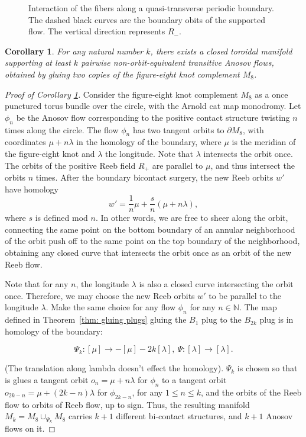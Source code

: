 \documentclass[10pt,a4paper]{amsart}
\newtheorem{corollary}{Corollary}
\begin{document}
\begin{figure}
    \centering
    
    \caption{Interaction of the fibers along a quasi-transverse periodic boundary. The dashed black curves are the boundary obits of the supported flow. The vertical direction represents $R_-$.  }
    \label{fig:Fibers}
\end{figure}

\begin{corollary}
\label{cor:figure8}
For any natural number $k$, there exists a closed toroidal manifold supporting at least $k$ pairwise non-orbit-equivalent transitive Anosov flows, obtained by gluing two copies of the figure-eight knot complement $M_8$.
\end{corollary}

\begin{proof}[Proof of Corollary \ref{cor:figure8}]
Consider the figure-eight knot complement $M_8$ as a once punctured torus bundle over the circle, with the Arnold cat map monodromy. Let $\phi_n$ be the Anosov flow corresponding to the positive contact structure twisting $n$ times along the circle.
The flow $\phi_n$ has two tangent orbits to $\partial M_8$, with coordinates $\mu+n\lambda$ in the homology of the boundary, where $\mu$ is the meridian of the figure-eight knot and $\lambda$ the longitude. 
Note that $\lambda$ intersects the orbit once.
The orbits of the positive Reeb field $R_+$ are parallel to $\mu$, and thus intersect the orbits $n$ times. After the boundary bicontact surgery, the new Reeb orbits $w'$ have homology 
\[
w'=\frac{1}{n}\mu+\frac{s}{n} (\mu+n\lambda),
\]
where $s$ is defined mod $n$. In other words, we are free to sheer along the orbit, connecting the same point on the bottom boundary of an annular neighborhood of the orbit push off to the same point on the top boundary of the neighborhood, obtaining any closed curve that intersects the orbit once as an orbit of the new Reeb flow.

Note that for any $n$, the longitude $\lambda$ is also a closed curve intersecting the orbit once. 
Therefore, we may choose the new Reeb orbits $w'$ to be parallel to the longitude $\lambda$. Make the same choice for any flow $\phi_n$ for any $n\in\mathbb{N}$. The map defined in Theorem~\ref{thm: gluing plugs} gluing the $B_1$ plug to the $B_{2k}$ plug is in homology of the boundary: 

\[
\Psi_k: [\mu]\to -[\mu]-2k[\lambda],\ \Psi:[\lambda]\to [\lambda].
\]

(The translation along lambda doesn't effect the homology).
$\Psi_k$ is chosen so that is glues a tangent orbit $o_n=\mu+n\lambda$ for $\phi_n$ to a tangent orbit $o_{2k-n}=\mu+(2k-n)\lambda$ for $\phi_{2k-n}$, for any $1\leq n\leq k$, and the orbits of the Reeb flow to orbits of Reeb flow, up to sign.
Thus, the resulting manifold $M_k=M_8\cup_{\Psi_k}M_8$ carries $k+1$ different bi-contact structures, and $k+1$ Anosov flows on it. 


\end{proof}
\end{document}
